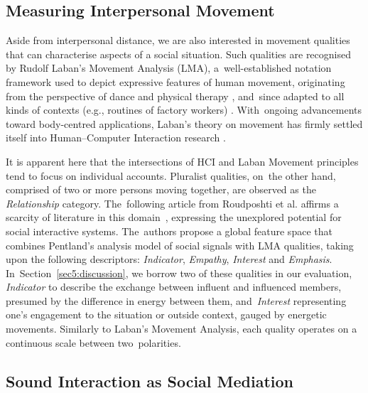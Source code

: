{\subsection*{Measuring Interpersonal Movement}
\label{sec2_measuring}

Aside from interpersonal distance, we are also interested in movement qualities that can characterise aspects of a social situation. Such qualities are recognised by Rudolf Laban’s Movement Analysis (LMA), a~well-established notation framework used to depict expressive features of human movement, originating from the perspective of dance and physical therapy \citep{laban_mastery_1988}, and~since adapted to all kinds of contexts (e.g., routines of factory workers) \citep{davies_beyond_2006}. With~ongoing advancements toward body-centred applications, Laban's theory on movement has firmly settled itself into Human--Computer Interaction research \citep{ziegelmaier_laban_2020}.

It is apparent here that the intersections of HCI and Laban Movement principles tend to focus on individual accounts. Pluralist qualities, on~the other hand, comprised of two or more persons moving together, are observed as the \textit{Relationship} category. The~following article from Roudposhti et al. %
affirms a scarcity of literature in this domain~\cite{roudposhti_parameterizing_2012}, expressing the unexplored potential for social interactive systems. The~authors propose a global feature space that combines Pentland's analysis model of social signals \citep{pentland_honest_2010} with LMA qualities, taking upon the following descriptors: \textit{Indicator}, \textit{Empathy}, \textit{Interest} and \textit{Emphasis}. In~Section~\ref{sec5:discussion}, we borrow two of these qualities in our evaluation, \textit{Indicator} to describe the exchange between influent and influenced members, presumed by the difference in energy between them, and~\textit{Interest} representing one's engagement to the situation or outside context, gauged by energetic movements. Similarly to Laban's Movement Analysis, each quality operates on a continuous scale between two~polarities.

\subsection*{Sound Interaction as Social Mediation}
\label{subsec:soundInteraction}

}

